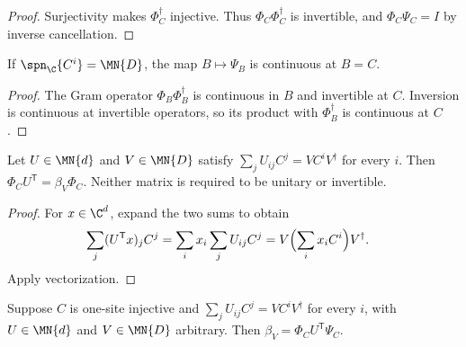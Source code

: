 \begin{proof}\leanok
    Surjectivity makes $\Phi_C^\dagger$ injective. Thus
    $\Phi_C\Phi_C^\dagger$ is invertible, and $\Phi_C\Psi_C=I$ by
    inverse cancellation.
\end{proof}

\begin{lemma}
    \label{thm:spc_aux_coefficient_inverse_continuity}
    \leanok
    If $\spn_{\C}\{C^i\}=\MN{D}$, the map $B\mapsto\Psi_B$ is
    continuous at $B=C$.
\end{lemma}

\begin{proof}\leanok
    The Gram operator $\Phi_B\Phi_B^\dagger$ is continuous in $B$ and
    invertible at $C$. Inversion is continuous at invertible operators,
    so its product with $\Phi_B^\dagger$ is continuous at $C$.
\end{proof}

\begin{lemma}
    \label{thm:spc_aux_coefficient_covariance}
    \leanok
    Let $U\in\MN{d}$ and $V\in\MN{D}$ satisfy
    $\sum_j U_{ij}C^j=VC^iV^\dagger$ for every $i$. Then
    $\Phi_C U^{\mathsf T}=\beta_V\Phi_C$.
    Neither matrix is required to be unitary or invertible.
\end{lemma}

\begin{proof}\leanok
    For $x\in\C^d$, expand the two sums to obtain
    \begin{align}
        \sum_j (U^{\mathsf T}x)_j C^j
         & =\sum_i x_i\sum_j U_{ij}C^j
        =V\Bigl(\sum_i x_iC^i\Bigr)V^\dagger.\notag
    \end{align}
    Apply vectorization.
\end{proof}

\begin{lemma}
    \label{thm:spc_aux_adjoint_coefficient_formula}
    \leanok
    Suppose $C$ is one-site injective and
    $\sum_j U_{ij}C^j=VC^iV^\dagger$ for every $i$, with
    $U\in\MN{d}$ and $V\in\MN{D}$ arbitrary. Then
    $\beta_V=\Phi_C U^{\mathsf T}\Psi_C$.
\end{lemma}

